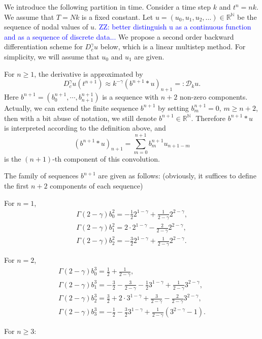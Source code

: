 \documentclass[11pt]{article} %
\newcommand{\zz}[1]{\textcolor{blue}{ZZ: #1}}
\begin{document}
We introduce the following partition in time. Consider a time step $k$ and $t^n=nk$. We assume that $T=Nk$ is a fixed constant. 
Let $u=(u_0, u_1, u_2, \ldots)\in \mathbb{R}^{\mathbb{N}}$ be the sequence of nodal values of $u$. \zz{better distinguish u as a continuous function and as a sequence of discrete data...}  We propose a second order backward differentiation scheme for $D_c^{\gamma}u$ below, which is a  linear multistep method. For simplicity, we will assume that $u_0$ and $u_1$ are given. 

For $n\ge 1$, the derivative is approximated by $$
D_c^{\gamma}u(t^{n+1})\approx
k^{-\gamma}(b^{n+1}*u)_{n+1}=:\mathcal{D}_k u.
$$
Here $b^{n+1}=(b_0^{n+1},\cdots,b_{n+1}^{n+1})$ is a sequence with $n+2$  non-zero components. Actually, we can extend the finite sequence $b^{n+1}$  by setting $b_m^{n+1}=0, \,m\ge n+2$, then with a bit abuse of notation, we still denote $b^{n+1}\in\mathbb{R}^{\mathbb{N}}$. Therefore $b^{n+1}*u$ is interpreted according to the definition above, and 
\[
(b^{n+1}*u)_{n+1}=\sum_{m=0}^{n+1}b_{m}^{n+1}u_{n+1-m}
\]
 is the $(n+1)$-th component of this convolution.

The family of sequences $b^{n+1}$ are given as follows: (obviously, it suffices to define the first $n+2$ components of each sequence)

For $n=1$,
\begin{gather*}
\Gamma(2-\gamma)b_{0}^{2}=-\frac{1}{2}2^{1-\gamma}+\frac{1}{2-\gamma}2^{2-\gamma},\\
\Gamma(2-\gamma)b_{1}^{2}=2\cdot 2^{1-\gamma}-\frac{2}{2-\gamma}2^{2-\gamma},\\
\Gamma(2-\gamma)b_{2}^{2}=-\frac{3}{2}2^{1-\gamma}+\frac{1}{2-\gamma}2^{2-\gamma}.
\end{gather*}

For $n=2$,
\begin{gather*}
\Gamma(2-\gamma)b_{0}^{3}=\frac{1}{2}+\frac{1}{2-\gamma},\\
\Gamma(2-\gamma)b_{1}^{3}
=-\frac{3}{2}-\frac{3}{2-\gamma}-\frac{1}{2}3^{1-\gamma}
+\frac{1}{2-\gamma}3^{2-\gamma},\\
\Gamma(2-\gamma)b_{2}^{3}=\frac{3}{2}+2\cdot 3^{1-\gamma}
+\frac{3}{2-\gamma}-\frac{2}{2-\gamma}3^{2-\gamma},\\
\Gamma(2-\gamma)b_{3}^{3}=-\frac{1}{2}
-\frac{3}{2}3^{1-\gamma}+\frac{1}{2-\gamma}(3^{2-\gamma}-1).
\end{gather*}

For $n\ge 3$:
\end{document}
